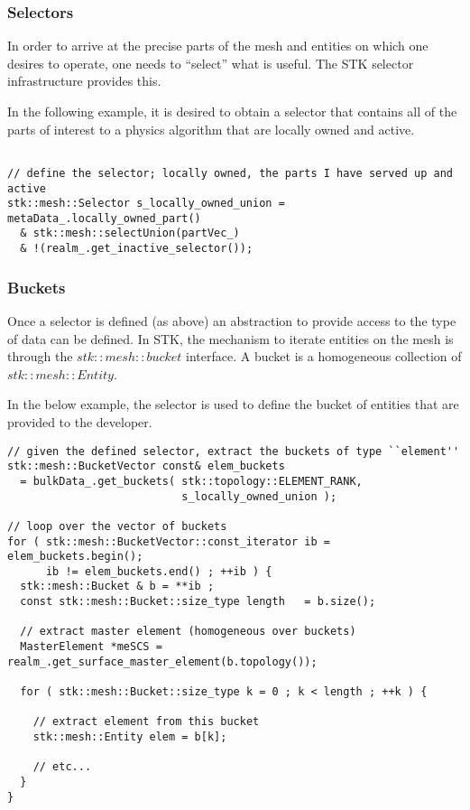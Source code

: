 \subsubsection{Selectors}
In order to arrive at the precise parts of the mesh and entities on which one desires
to operate, one needs to ``select'' what is useful. The STK selector infrastructure provides this.

In the following example, it is desired to obtain a selector that contains all of the parts of 
interest to a physics algorithm that are locally owned and active.

\begin{lstlisting}

// define the selector; locally owned, the parts I have served up and active
stk::mesh::Selector s_locally_owned_union = metaData_.locally_owned_part()
  & stk::mesh::selectUnion(partVec_) 
  & !(realm_.get_inactive_selector());

\end{lstlisting}

\subsubsection{Buckets}
Once a selector is defined (as above) an abstraction to provide access to the type of 
data can be defined. In STK, the mechanism to iterate entities on the mesh is through the 
$stk::mesh::bucket$ interface. A bucket is a homogeneous collection of $stk::mesh::Entity$.

In the below example, the selector is used to define the bucket of entities that are provided
to the developer.

\begin{lstlisting}
// given the defined selector, extract the buckets of type ``element''
stk::mesh::BucketVector const& elem_buckets 
  = bulkData_.get_buckets( stk::topology::ELEMENT_RANK, 
                           s_locally_owned_union );

// loop over the vector of buckets 
for ( stk::mesh::BucketVector::const_iterator ib = elem_buckets.begin();
      ib != elem_buckets.end() ; ++ib ) {
  stk::mesh::Bucket & b = **ib ;
  const stk::mesh::Bucket::size_type length   = b.size();

  // extract master element (homogeneous over buckets)
  MasterElement *meSCS = realm_.get_surface_master_element(b.topology());
  
  for ( stk::mesh::Bucket::size_type k = 0 ; k < length ; ++k ) {
    
    // extract element from this bucket
    stk::mesh::Entity elem = b[k];
    
    // etc...
  }
}

\end{lstlisting}

